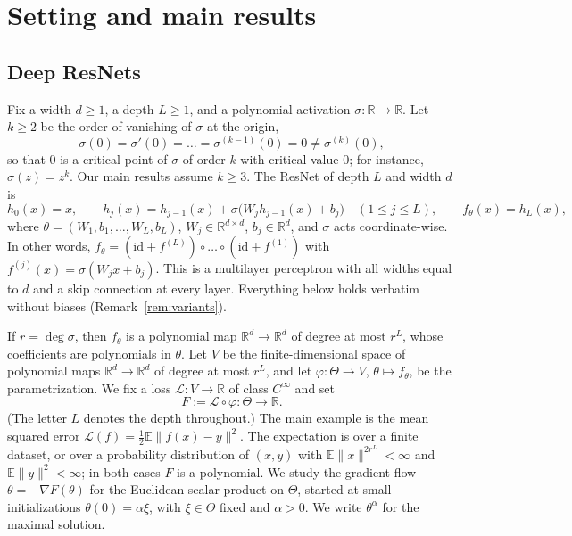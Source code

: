 \documentclass[11pt]{article}
\theoremstyle{definition}
\theoremstyle{remark}
\numberwithin{equation}{section}
\newcommand{\R}{\mathbb{R}}
\newcommand{\E}{\mathbb{E}}
\newcommand{\cL}{\mathcal{L}}
\newcommand{\id}{\mathrm{id}}
\begin{document}
\section{Setting and main results}\label{sec:setting}

\subsection{Deep ResNets}

Fix a width $d\ge1$, a depth $L\ge1$, and a polynomial activation $\sigma\colon\R\to\R$. Let $k\ge2$ be the order of vanishing of $\sigma$ at the origin,
\begin{equation}\label{eq:order}
\sigma(0)=\sigma'(0)=\dots=\sigma^{(k-1)}(0)=0\neq\sigma^{(k)}(0),
\end{equation}
so that $0$ is a critical point of $\sigma$ of order $k$ with critical value $0$; for instance, $\sigma(z)=z^k$. Our main results assume $k\ge3$. The ResNet of depth $L$ and width $d$ is
\begin{equation}\label{eq:resnet}
h_0(x)=x,\qquad h_j(x)=h_{j-1}(x)+\sigma\big(W_jh_{j-1}(x)+b_j\big)\quad(1\le j\le L),\qquad f_\theta(x)=h_L(x),
\end{equation}
where $\theta=(W_1,b_1,\dots,W_L,b_L)$, $W_j\in\R^{d\times d}$, $b_j\in\R^d$, and $\sigma$ acts coordinate-wise. In other words, $f_\theta=(\id+f^{(L)})\circ\dots\circ(\id+f^{(1)})$ with $f^{(j)}(x)=\sigma(W_jx+b_j)$. This is a multilayer perceptron with all widths equal to $d$ and a skip connection at every layer. Everything below holds verbatim without biases (Remark~\ref{rem:variants}).

If $r=\deg\sigma$, then $f_\theta$ is a polynomial map $\R^d\to\R^d$ of degree at most $r^L$, whose coefficients are polynomials in $\theta$. Let $V$ be the finite-dimensional space of polynomial maps $\R^d\to\R^d$ of degree at most $r^L$, and let $\varphi\colon\Theta\to V$, $\theta\mapsto f_\theta$, be the parametrization. We fix a loss $\cL\colon V\to\R$ of class $C^\infty$ and set
\[
F:=\cL\circ\varphi\colon\Theta\to\R .
\]
(The letter $L$ denotes the depth throughout.) The main example is the mean squared error $\cL(f)=\frac12\E\|f(x)-y\|^2$. The expectation is over a finite dataset, or over a probability distribution of $(x,y)$ with $\E\|x\|^{2r^L}<\infty$ and $\E\|y\|^2<\infty$; in both cases $F$ is a polynomial. We study the gradient flow $\dot\theta=-\nabla F(\theta)$ for the Euclidean scalar product on $\Theta$, started at small initializations $\theta(0)=\alpha\xi$, with $\xi\in\Theta$ fixed and $\alpha>0$. We write $\theta^\alpha$ for the maximal solution.
\end{document}
